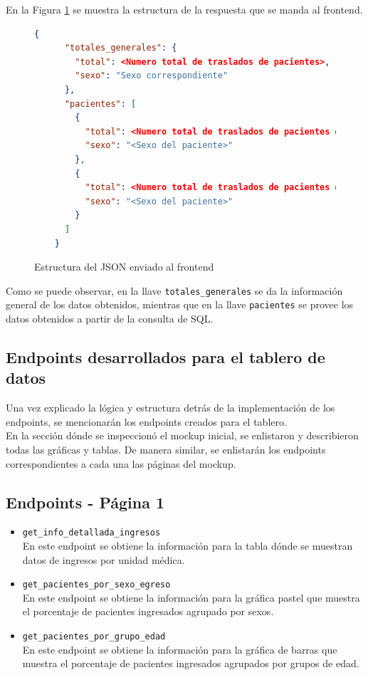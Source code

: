 \begin{enumerate}
   En la Figura \ref{fig:json-estructura} se muestra la estructura de la respuesta que se manda al frontend.

   \begin{figure}[H]
    \centering
    \begin{lstlisting}[language=json, style=json]
    {
      "totales_generales": {
        "total": <Numero total de traslados de pacientes>,
        "sexo": "Sexo correspondiente"
      },
      "pacientes": [
        {
          "total": <Numero total de traslados de pacientes de un sexo especifico>,
          "sexo": "<Sexo del paciente>"
        },
        {
          "total": <Numero total de traslados de pacientes de otro sexo especifico>,
          "sexo": "<Sexo del paciente>"
        }
      ]
    }
    \end{lstlisting}
    \caption{Estructura del JSON enviado al frontend}
    \label{fig:json-estructura}
\end{figure}

Como se puede observar, en la llave \texttt{totales\_generales} se da la información general de los datos obtenidos, mientras que en la llave \texttt{pacientes} se provee los datos obtenidos a partir de la consulta de SQL.

\end{enumerate}

\subsection{Endpoints desarrollados para el tablero de datos}
Una vez explicado la lógica y estructura detrás de la implementación de los endpoints, se mencionarán los endpoints creados para el tablero.\\

En la sección dónde se inspeccionó el mockup inicial, se enlistaron y describieron todas las gráficas y tablas. De manera similar, se enlistarán los endpoints correspondientes a cada una las páginas del mockup.

\subsection{Endpoints - Página 1}
\begin{itemize}
    \item \texttt{get\_info\_detallada\_ingresos}\\
    En este endpoint se obtiene la información para la tabla dónde se muestran datos de ingresos por unidad médica.

    \item \texttt{get\_pacientes\_por\_sexo\_egreso}\\
    En este endpoint se obtiene la información para la gráfica pastel que muestra el porcentaje de pacientes ingresados agrupado por sexos.

    \item \texttt{get\_pacientes\_por\_grupo\_edad}\\
    En este endpoint se obtiene la información para la gráfica de barras que muestra el porcentaje de pacientes ingresados agrupados por grupos de edad.
    
\end{itemize}


